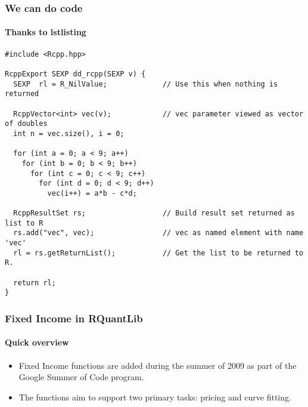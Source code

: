 \documentclass[smaller,compress]{beamer}
\begin{document}
\begin{frame}[fragile]  %
  \frametitle{We can do code}
  \framesubtitle{Thanks to lstlisting}

\lstset{language=C++,basicstyle=\tiny}
\begin{lstlisting}
#include <Rcpp.hpp>

RcppExport SEXP dd_rcpp(SEXP v) {
  SEXP  rl = R_NilValue;             // Use this when nothing is returned

  RcppVector<int> vec(v);            // vec parameter viewed as vector of doubles
  int n = vec.size(), i = 0;

  for (int a = 0; a < 9; a++)
    for (int b = 0; b < 9; b++)
      for (int c = 0; c < 9; c++)
        for (int d = 0; d < 9; d++)
          vec(i++) = a*b - c*d;

  RcppResultSet rs;                  // Build result set returned as list to R
  rs.add("vec", vec);                // vec as named element with name 'vec'
  rl = rs.getReturnList();           // Get the list to be returned to R.

  return rl;
}
\end{lstlisting}


\end{frame}

\begin{frame}
	\frametitle{Fixed Income in RQuantLib}
	\framesubtitle{Quick overview}
	\begin{itemize}
		\item Fixed Income functions are added during the summer of 2009 as part of the Google Summer of 	Code program. \pause
		\item The functions aim to support two primary tasks: pricing and curve fitting. 		
	\end{itemize}
\end{frame}
\end{document}
